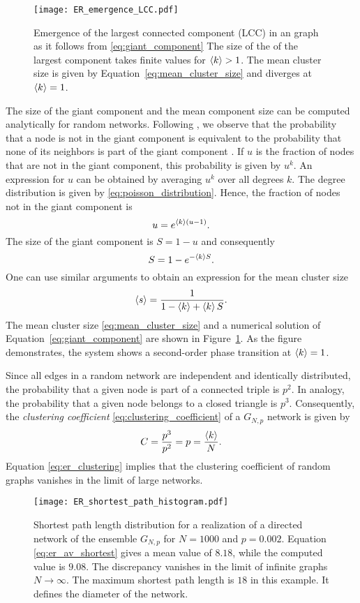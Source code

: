 %
\begin{SCfigure}
\texttt{[image: ER\_emergence\_LCC.pdf]}
\caption{Emergence of the largest connected component (LCC) in an \ER graph as it follows from \eqref{eq:giant_component}
The size of the of the largest component takes finite values for $\left< k \right>>1$.
The mean cluster size is given by Equation~\eqref{eq:mean_cluster_size} and diverges at $\left< k \right>=1$.
}
\label{fig:ER_lcc_emergence}
\end{SCfigure}
%
The size of the giant component and the mean component size can be computed analytically for random networks.
Following \citeauthor{Newman2003}, we observe that the probability that a node is not in the giant component is equivalent to the probability that none of its neighbors is part of the giant component \citep{Newman2003}.
If $u$ is the fraction of nodes that are not in the giant component, this probability is given by $u^k$.
An expression for $u$ can be obtained by averaging $u^k$ over all degrees $k$.
The degree distribution is given by \eqref{eq:poisson_distribution}.
Hence, the fraction of nodes not in the giant component is
\[
u=e^{\left< k \right>(u-1)}.
\]
The size of the giant component is $S=1-u$ and consequently
\begin{equation}\label{eq:giant_component}
S=1-e^{-\left< k \right>S}.
\end{equation}
One can use similar arguments to obtain an expression for the mean cluster size \citep{Newman2003}
\begin{equation}\label{eq:mean_cluster_size}
\left< s \right>=\frac{1}{1-\left< k \right>+\left< k \right>S}.
\end{equation}
%
The mean cluster size \eqref{eq:mean_cluster_size} and a numerical solution of Equation~\eqref{eq:giant_component}
are shown in Figure~\ref{fig:ER_lcc_emergence}.
As the figure demonstrates, the system shows a second-order phase transition at $\left< k \right>=1$.

Since all edges in a random network are independent and identically distributed, the probability that a given node is part of a connected triple is $p^2$.
In analogy, the probability that a given node belongs to a closed triangle is $p^3$.
Consequently, the \emph{clustering coefficient}  \eqref{eq:clustering_coefficient} of a $G_{N,p}$ network is given by
\begin{equation}\label{eq:er_clustering}
C=\frac{p^3}{p^2}=p=\frac{\left< k \right>}{N}.
\end{equation}
Equation \eqref{eq:er_clustering} implies that the clustering coefficient of random graphs vanishes in the limit of large networks.
%
\begin{SCfigure}
\texttt{[image: ER\_shortest\_path\_histogram.pdf]}
\caption{Shortest path length distribution for a realization of a directed \ER network of the ensemble $G_{N,p}$ for $N=1000$ and $p=0.002$.
Equation \eqref{eq:er_av_shortest} gives a mean value of $8.18$, while the computed value is $9.08$.
The discrepancy vanishes in the limit of infinite graphs $N\rightarrow \infty$.
The maximum shortest path length is $18$ in this example.
It defines the diameter of the network.}
\label{fig:ER_shortest_path_histogram}
\end{SCfigure}
%

